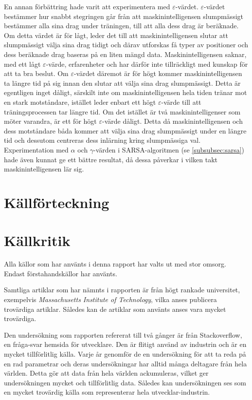 \documentclass[12pt,a4paper]{article}
\begin{document}
    En annan förbättring hade varit att experimentera med $\varepsilon$-värdet. $\varepsilon$-värdet bestämmer hur snabbt stegringen går från att maskinintelligensen slumpmässigt bestämmer alla sina drag under träningen, till att alla dess drag är beräknade. Om detta värdet är för lågt, leder det till att maskinintelligensen slutar att slumpmässigt välja sina drag tidigt och därav utforskas få typer av positioner och dess beräknade drag baseras på en liten mängd data. Maskinintelligensen saknar, med ett lågt $\varepsilon$-värde, erfarenheter och har därför inte tillräckligt med kunskap för att ta bra beslut. Om $\varepsilon$-värdet däremot är för högt kommer maskinintelligensen ta längre tid på sig innan den slutar att välja sina drag slumpmässigt. Detta är egentligen inget dåligt, särskilt inte om maskinintelligensen hela tiden tränar mot en stark motståndare, istället leder enbart ett högt $\varepsilon$-värde till att träningsprocessen tar längre tid. Om det istället är två maskinintelligenser som möter varandra, är ett för högt $\varepsilon$-värde dåligt. Detta då maskinintelligensen och dess motståndare båda kommer att välja sina drag slumpmässigt under en längre tid och dessutom centreras dess inlärning kring slumpmässiga val. Experimentation med $\alpha$ och $\gamma$-värden i SARSA-algoritmen (se \ref{subsubsec:sarsa}) hade även kunnat ge ett bättre resultat, då dessa påverkar i vilken takt maskinintelligensen lär sig. 

  \cleardoublepage

  \section{Källförteckning} \printbibliography[heading=none]

  \section{Källkritik}\label{sec:kallkritik} 
    Alla källor som har använts i denna rapport har valts ut med stor omsorg. Endast förstahandskällor har använts.

    Samtliga artiklar som har nämnts i rapporten är från högt rankade universitet, exempelvis \emph{Massachusetts Institute of Technology}, vilka anses publicera trovärdiga artiklar. Således kan de artiklar som använts anses vara mycket trovärdiga. 

    Den undersökning som rapporten refererat till två gånger är från Stackoverflow, en fråga-svar hemsida för utvecklare. Den är flitigt använd av industrin och är en mycket tillförlitlig källa. Varje år genomför de en undersökning för att ta reda på en rad parametrar och deras undersökningar har alltid många deltagare från hela världen. Detta gör att data från hela världen ackumuleras, vilket ger undersökningen mycket och tillförlitlig data. Således kan undersökningen ses som en mycket trovärdig källa som representerar hela utvecklar-industrin.
\end{document}
